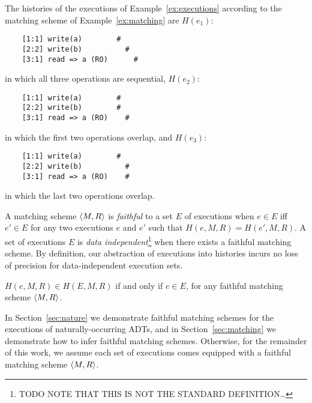 \begin{example}
  \label{ex:histories-of-executions}

  The histories of the executions of Example~\ref{ex:executions} according to
  the matching scheme of Example~\ref{ex:matching} are $H(e_1)$:
\begin{verbatim}
    [1:1] write(a)        #
    [2:2] write(b)          #
    [3:1] read => a (RO)      #
\end{verbatim}
  in which all three operations are sequential, $H(e_2)$:
\begin{verbatim}
    [1:1] write(a)        #
    [2:2] write(b)        #
    [3:1] read => a (RO)    #
\end{verbatim}
  in which the first two operations overlap, and $H(e_3)$:
\begin{verbatim}
    [1:1] write(a)        #
    [2:2] write(b)          #
    [3:1] read => a (RO)    #
\end{verbatim}
  in which the last two operations overlap.

\end{example}

A matching scheme ${\left\langle{M,R}\right\rangle}$ is \emph{faithful} to a set $E$ of executions
when $e \in E$ if{f} $e' \in E$ for any two executions $e$ and $e'$ such that
$H(e,M,R) = H(e',M,R)$. A set of executions $E$ is \emph{data
independent}\footnote{TODO NOTE THAT THIS IS NOT THE STANDARD DEFINITION…} when
there exists a faithful matching scheme. By definition, our abstraction of
executions into histories incurs no loss of precision for data-independent
execution sets.

\begin{lemma}

  $H(e,M,R) \in H(E,M,R)$ if and only if $e \in E$, for any faithful matching
  scheme ${\left\langle{M,R}\right\rangle}$.

\end{lemma}

In Section~\ref{sec:nature} we demonstrate faithful matching schemes for the
executions of naturally-occurring ADTs, and in Section~\ref{sec:matching} we
demonstrate how to infer faithful matching schemes. Otherwise, for the
remainder of this work, we assume each set of executions comes equipped with a
faithful matching scheme ${\left\langle{M,R}\right\rangle}$.

